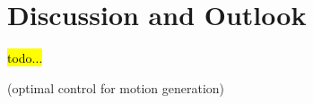 \section{Discussion and Outlook}
\label{sec:discussion}
\hl{todo...}

\cite{Tass12}\cite{Kuma13}(optimal control for motion generation)